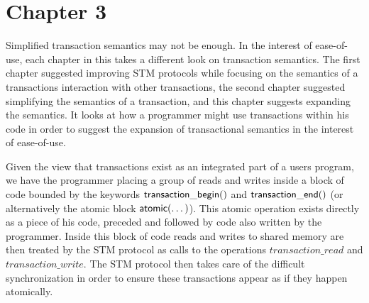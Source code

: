 % 














\section{Chapter 3}
Simplified transaction semantics may not be enough.
In the interest of ease-of-use, each chapter in this takes a 
different look on transaction semantics.
The first chapter suggested improving STM
protocols while focusing on the semantics of a transactions
interaction with other transactions, the second
chapter suggested simplifying the semantics of a transaction,
and this chapter suggests expanding the semantics.
It looks at how a programmer might use transactions
within his code in order to suggest the expansion of transactional
semantics in the interest of ease-of-use.




Given the view that transactions exist as an integrated part of
a users program, we have
the programmer placing a group of reads and writes
inside a block of code bounded by the keywords $\act{transaction\_begin}()$ and
$\act{transaction\_end}()$ (or alternatively the atomic block $\act{atomic}(\dots)$).
This atomic operation exists directly as a piece of his code, preceded
and followed by code also written by the programmer.
Inside this block of code reads and writes to shared memory are then
treated by the STM protocol as calls to the operations
$transaction\_read$ and $transaction\_write$.
The STM protocol then
takes care of the difficult synchronization in order to ensure these transactions
appear as if they happen atomically.

